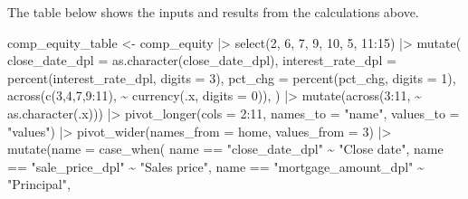\documentclass[
  letterpaper,
  DIV=11,
  numbers=noendperiod]{scrartcl}
\newenvironment{Shaded}{\begin{snugshade}}{\end{snugshade}}
\newcommand{\AttributeTok}[1]{\textcolor[rgb]{0.40,0.45,0.13}{#1}}
\newcommand{\DecValTok}[1]{\textcolor[rgb]{0.68,0.00,0.00}{#1}}
\newcommand{\FunctionTok}[1]{\textcolor[rgb]{0.28,0.35,0.67}{#1}}
\newcommand{\NormalTok}[1]{\textcolor[rgb]{0.00,0.23,0.31}{#1}}
\newcommand{\OtherTok}[1]{\textcolor[rgb]{0.00,0.23,0.31}{#1}}
\newcommand{\SpecialCharTok}[1]{\textcolor[rgb]{0.37,0.37,0.37}{#1}}
\newcommand{\StringTok}[1]{\textcolor[rgb]{0.13,0.47,0.30}{#1}}
\begin{document}
The table below shows the inputs and results from the calculations
above.

\begin{Shaded}
\begin{Highlighting}[]
\NormalTok{comp\_equity\_table }\OtherTok{\textless{}{-}}\NormalTok{ comp\_equity }\SpecialCharTok{|\textgreater{}} 
  \FunctionTok{select}\NormalTok{(}\DecValTok{2}\NormalTok{, }\DecValTok{6}\NormalTok{, }\DecValTok{7}\NormalTok{, }\DecValTok{9}\NormalTok{, }\DecValTok{10}\NormalTok{, }\DecValTok{5}\NormalTok{, }\DecValTok{11}\SpecialCharTok{:}\DecValTok{15}\NormalTok{) }\SpecialCharTok{|\textgreater{}} 
  \FunctionTok{mutate}\NormalTok{(}
    \AttributeTok{close\_date\_dpl =} \FunctionTok{as.character}\NormalTok{(close\_date\_dpl),}
    \AttributeTok{interest\_rate\_dpl =} \FunctionTok{percent}\NormalTok{(interest\_rate\_dpl, }\AttributeTok{digits =} \DecValTok{3}\NormalTok{),}
    \AttributeTok{pct\_chg =} \FunctionTok{percent}\NormalTok{(pct\_chg, }\AttributeTok{digits =} \DecValTok{1}\NormalTok{),}
    \FunctionTok{across}\NormalTok{(}\FunctionTok{c}\NormalTok{(}\DecValTok{3}\NormalTok{,}\DecValTok{4}\NormalTok{,}\DecValTok{7}\NormalTok{,}\DecValTok{9}\SpecialCharTok{:}\DecValTok{11}\NormalTok{), }\SpecialCharTok{\textasciitilde{}} \FunctionTok{currency}\NormalTok{(.x, }\AttributeTok{digits =} \DecValTok{0}\NormalTok{)),}
\NormalTok{    ) }\SpecialCharTok{|\textgreater{}} 
  \FunctionTok{mutate}\NormalTok{(}\FunctionTok{across}\NormalTok{(}\DecValTok{3}\SpecialCharTok{:}\DecValTok{11}\NormalTok{, }\SpecialCharTok{\textasciitilde{}} \FunctionTok{as.character}\NormalTok{(.x))) }\SpecialCharTok{|\textgreater{}} 
  \FunctionTok{pivot\_longer}\NormalTok{(}\AttributeTok{cols =} \DecValTok{2}\SpecialCharTok{:}\DecValTok{11}\NormalTok{, }\AttributeTok{names\_to =} \StringTok{"name"}\NormalTok{, }\AttributeTok{values\_to =} \StringTok{"values"}\NormalTok{) }\SpecialCharTok{|\textgreater{}} 
  \FunctionTok{pivot\_wider}\NormalTok{(}\AttributeTok{names\_from =}\NormalTok{ home, }\AttributeTok{values\_from =} \DecValTok{3}\NormalTok{) }\SpecialCharTok{|\textgreater{}} 
  \FunctionTok{mutate}\NormalTok{(}\AttributeTok{name =} \FunctionTok{case\_when}\NormalTok{(}
\NormalTok{    name }\SpecialCharTok{==} \StringTok{"close\_date\_dpl"} \SpecialCharTok{\textasciitilde{}} \StringTok{"Close date"}\NormalTok{,}
\NormalTok{    name }\SpecialCharTok{==} \StringTok{"sale\_price\_dpl"} \SpecialCharTok{\textasciitilde{}} \StringTok{"Sales price"}\NormalTok{,}
\NormalTok{    name }\SpecialCharTok{==} \StringTok{"mortgage\_amount\_dpl"} \SpecialCharTok{\textasciitilde{}} \StringTok{"Principal"}\NormalTok{,}

\end{Highlighting}
\end{Shaded}
\end{document}
